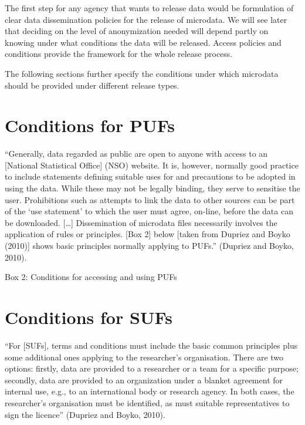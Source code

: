 \documentclass[letterpaper,10pt,english]{sphinxmanual}
\begin{document}
The first step for any agency that wants to release data would be
formulation of clear data dissemination policies for the release of
microdata. We will see later that deciding on the level of anonymization
needed will depend partly on knowing under what conditions the data will
be released. Access policies and conditions provide the framework for
the whole release process.

The following sections further specify the conditions under which
microdata should be provided under different release types.


\section{Conditions for PUFs}
\label{\detokenize{SDC_intro:conditions-for-pufs}}
“Generally, data regarded as public are open to anyone with access to an
{[}National Statistical Office{]} (NSO) website. It is, however, normally
good practice to include statements defining suitable uses for and
precautions to be adopted in using the data. While these may not be
legally binding, they serve to sensitise the user. Prohibitions such as
attempts to link the data to other sources can be part of the ‘use
statement’ to which the user must agree, on-line, before the data can be
downloaded. {[}…{]} Dissemination of microdata files necessarily involves
the application of rules or principles. {[}Box 2{]} below {[}taken from
Dupriez and Boyko (2010){]} shows basic principles normally applying to
PUFs.” (Dupriez and Boyko, 2010).

Box 2: Conditions for accessing and using PUFs


\section{Conditions for SUFs}
\label{\detokenize{SDC_intro:conditions-for-sufs}}
“For {[}SUFs{]}, terms and conditions must include the basic common
principles plus some additional ones applying to the researcher’s
organisation. There are two options: firstly, data are provided to a
researcher or a team for a specific purpose; secondly, data are provided
to an organization under a blanket agreement for internal use, e.g., to
an international body or research agency. In both cases, the
researcher’s organisation must be identified, as must suitable
representatives to sign the licence” (Dupriez and Boyko, 2010).

\end{document}
